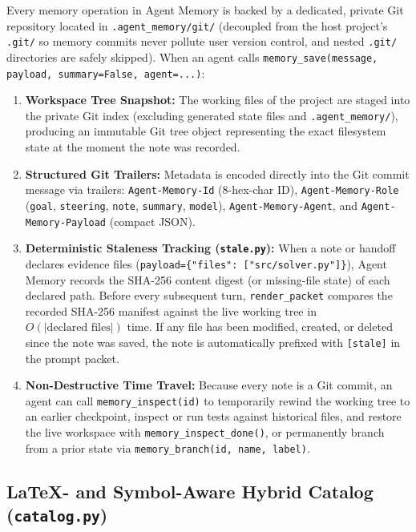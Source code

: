 \documentclass[11pt,a4paper]{article}
\begin{document}
Every memory operation in Agent Memory is backed by a dedicated, private Git repository located in \texttt{.agent\_memory/git/} (decoupled from the host project's \texttt{.git/} so memory commits never pollute user version control, and nested \texttt{.git/} directories are safely skipped). When an agent calls \texttt{memory\_save(message, payload, summary=False, agent=...)}:
\begin{enumerate}[leftmargin=1.5em]
    \item \textbf{Workspace Tree Snapshot:} The working files of the project are staged into the private Git index (excluding generated state files and \texttt{.agent\_memory/}), producing an immutable Git tree object representing the exact filesystem state at the moment the note was recorded.
    \item \textbf{Structured Git Trailers:} Metadata is encoded directly into the Git commit message via trailers: \texttt{Agent-Memory-Id} (8-hex-char ID), \texttt{Agent-Memory-Role} (\texttt{goal}, \texttt{steering}, \texttt{note}, \texttt{summary}, \texttt{model}), \texttt{Agent-Memory-Agent}, and \texttt{Agent-Memory-Payload} (compact JSON).
    \item \textbf{Deterministic Staleness Tracking (\texttt{stale.py}):} When a note or handoff declares evidence files (\texttt{payload=\{"files": ["src/solver.py"]\}}), Agent Memory records the SHA-256 content digest (or missing-file state) of each declared path. Before every subsequent turn, \texttt{render\_packet} compares the recorded SHA-256 manifest against the live working tree in $O(|\text{declared files}|)$ time. If any file has been modified, created, or deleted since the note was saved, the note is automatically prefixed with \texttt{[stale]} in the prompt packet.
    \item \textbf{Non-Destructive Time Travel:} Because every note is a Git commit, an agent can call \texttt{memory\_inspect(id)} to temporarily rewind the working tree to an earlier checkpoint, inspect or run tests against historical files, and restore the live workspace with \texttt{memory\_inspect\_done()}, or permanently branch from a prior state via \texttt{memory\_branch(id, name, label)}.
\end{enumerate}

\subsection{LaTeX- and Symbol-Aware Hybrid Catalog (\texttt{catalog.py})}
\end{document}
